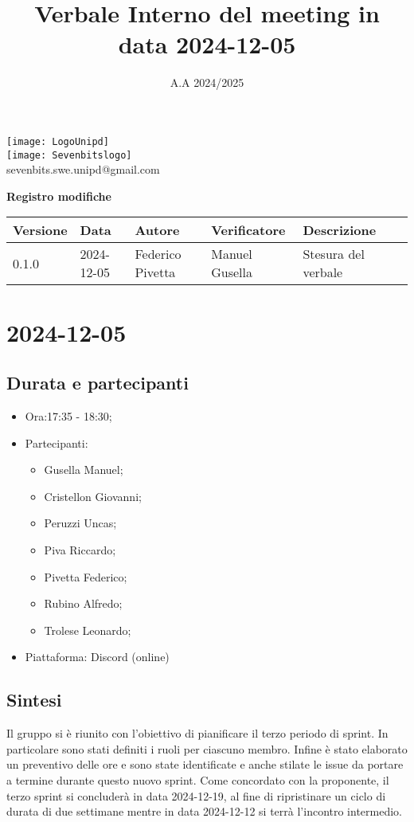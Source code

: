 \documentclass[10pt]{article}
\title{Verbale Interno del meeting in data 2024-12-05}
\date{A.A 2024/2025}
\begin{document}
\maketitle
\center 
\texttt{[image: LogoUnipd]}\\
\texttt{[image: Sevenbitslogo]}\\
sevenbits.swe.unipd@gmail.com\\
\vspace{2mm}

\textbf{Registro modifiche}\\
\vspace{2mm}
\begin{tabular}{|l|l|l|l|l|l|}
\hline
\textbf{Versione} & \textbf{Data} & \textbf{Autore} & \textbf{Verificatore} & \textbf{Descrizione} \\
\hline
0.1.0 & 2024-12-05 & Federico Pivetta & Manuel Gusella & Stesura del verbale\\
\hline
\end{tabular}

\newpage
\raggedright
\tableofcontents

\newpage
\section{2024-12-05}
\subsection{Durata e partecipanti}
\begin{itemize}
\item Ora:17:35 - 18:30;
\item Partecipanti: 	
	\begin{itemize}
	    \item Gusella Manuel;
            \item Cristellon Giovanni;
            \item Peruzzi Uncas;
            \item Piva Riccardo;
            \item Pivetta Federico;
            \item Rubino Alfredo;
            \item Trolese Leonardo;
	\end{itemize}
\item Piattaforma: Discord (online)
\end{itemize}

\subsection{Sintesi}
Il gruppo si è riunito con l'obiettivo di pianificare il terzo periodo di sprint. In particolare sono stati definiti i ruoli per ciascuno membro. Infine è stato elaborato un preventivo delle ore e sono state identificate e anche stilate le issue da portare a termine durante questo nuovo sprint.
Come concordato con la proponente, il terzo sprint si concluderà in data 2024-12-19, al fine di ripristinare un ciclo di durata di due settimane mentre in data 2024-12-12 si terrà l'incontro intermedio.\\
\end{document}
